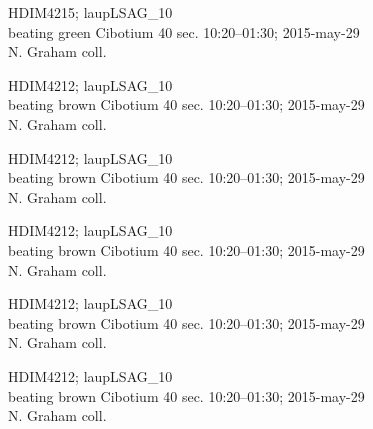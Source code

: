 \documentclass[2pt]{extarticle}
\begin{document}
\noindent
\parbox{0.16\textwidth}{\tiny \raggedright \rule[-0.3\baselineskip]{0pt}{10pt}HDIM4215; laupLSAG\_10\\ beating green Cibotium 40 sec. 10:20--01:30; 2015-may-29\\ N. Graham coll.}
\parbox{0.16\textwidth}{\tiny \raggedright \rule[-0.3\baselineskip]{0pt}{10pt}HDIM4212; laupLSAG\_10\\ beating brown Cibotium 40 sec. 10:20--01:30; 2015-may-29\\ N. Graham coll.}
\parbox{0.16\textwidth}{\tiny \raggedright \rule[-0.3\baselineskip]{0pt}{10pt}HDIM4212; laupLSAG\_10\\ beating brown Cibotium 40 sec. 10:20--01:30; 2015-may-29\\ N. Graham coll.}
\parbox{0.16\textwidth}{\tiny \raggedright \rule[-0.3\baselineskip]{0pt}{10pt}HDIM4212; laupLSAG\_10\\ beating brown Cibotium 40 sec. 10:20--01:30; 2015-may-29\\ N. Graham coll.}
\parbox{0.16\textwidth}{\tiny \raggedright \rule[-0.3\baselineskip]{0pt}{10pt}HDIM4212; laupLSAG\_10\\ beating brown Cibotium 40 sec. 10:20--01:30; 2015-may-29\\ N. Graham coll.}
\parbox{0.16\textwidth}{\tiny \raggedright \rule[-0.3\baselineskip]{0pt}{10pt}HDIM4212; laupLSAG\_10\\ beating brown Cibotium 40 sec. 10:20--01:30; 2015-may-29\\ N. Graham coll.} \\ 
\vspace{0.001in} 
\end{document}
